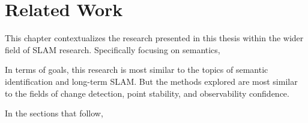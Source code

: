 \section{Related Work}
\label{sec:related_work}

This chapter contextualizes the research presented in this thesis within the wider field of SLAM research. Specifically focusing on semantics, 

In terms of goals, this research is most similar to the topics of semantic identification and long-term SLAM. But the methods explored are most similar to the fields of change detection, point stability, and observability confidence.

In the sections that follow, 
% 